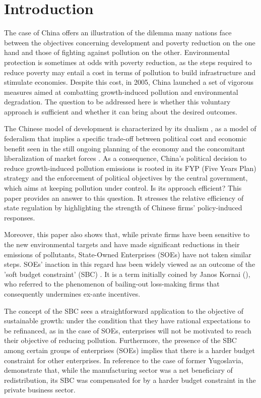 \documentclass[12pt]{article}
\begin{document}
\doublespacing

\section{Introduction} \label{sec:introduction}

The case of China offers an illustration of the dilemma many nations face between the objectives concerning development and poverty reduction on the one hand and those of fighting against pollution on the other. Environmental protection is sometimes at odds with poverty reduction, as the steps required to reduce poverty may entail a cost in terms of pollution to build infrastructure and stimulate economies. Despite this cost, in 2005, China launched a set of vigorous measures aimed at combatting growth-induced pollution and environmental degradation. The question to be addressed here is whether this voluntary approach is sufficient and whether it can bring about the desired outcomes. 

The Chinese model of development is characterized by its dualism \citep{Vahabi1995-fm}, as a model of federalism that implies a specific trade-off between political cost and economic benefit seen in the still ongoing planning of the economy and the concomitant liberalization of market forces \citep{Berglof1998-oc,Qian1998-yf}. As a consequence, China's political decision to reduce growth-induced pollution emissions is rooted in its FYP (Five Years Plan) strategy and the enforcement of political objectives by the central government, which aims at keeping pollution under control. Is its approach efficient? This paper provides an answer to this question. It stresses the relative efficiency of state regulation by highlighting the strength of Chinese firms' policy-induced responses. 

Moreover, this paper also shows that, while private firms have been sensitive to the new environmental targets and have made significant reductions in their emissions of pollutants, State-Owned Enterprises (SOEs) have not taken similar steps. SOEs' inaction in this regard has been widely viewed as an outcome of the 'soft budget constraint' (SBC) \citep{Kornai2003-nv}. It is a term initially coined by Janos Kornai (\citeyear{Kornai1993-kg, Kornai1995-cu, Kornai1998-ek, Kornai2001-bw}), who referred to the phenomenon of bailing-out loss-making firms that consequently undermines ex-ante incentives.

The concept of the SBC sees a straightforward application to the objective of sustainable growth: under the condition that they have rational expectations to be refinanced, as in the case of SOEs, enterprises will not be motivated to reach their objective of reducing pollution. Furthermore, the presence of the SBC among certain groups of enterprises (SOEs) implies that there is a harder budget constraint for other enterprises. In reference to the case of former Yugoslavia, \cite{Kraft1992-iy} demonstrate that, while the manufacturing sector was a net beneficiary of redistribution, its SBC was compensated for by a harder budget constraint in the private business sector. 
\end{document}
